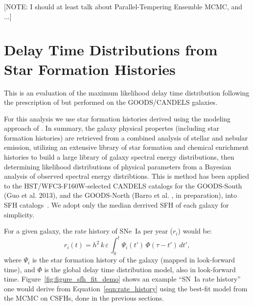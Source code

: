 \documentclass[apj]{aastex62}
\begin{document}
[NOTE: I should at least talk about Parallel-Tempering Ensemble MCMC, and ...]

\section{Delay Time Distributions from Star Formation Histories}
This is an evaluation of the maximum likelihood delay time distribution following the prescription of \cite{Maoz:2012a} but performed on the GOODS/CANDELS galaxies. 

For this analysis we use star formation histories derived using the modeling approach of \cite{Pacifici:2012ve}. In summary, the galaxy physical propertes (including star formation histories) are retrieved from a combined analysis of stellar and nebular emission, utilizing an extensive library of star formation and chemical enrichment histories to build a large library of galaxy spectral energy distributions, then determining likelihood distributions of physical parameters from a Bayesian analysis of observed spectral energy distribtions. This is method has been applied to the HST/WFC3-F160W-selected CANDELS catalogs for the GOODS-South (Guo et al. 2013), and the GOODS-North (Barro et al. , in preparation), into SFH catalogs~\cite{Pacifici:2016ul}. We adopt only the median derrived SFH of each galaxy for simplicity. 

For a given galaxy, the rate history of SNe~Ia per year ($r_i$) would be:
\begin{equation}
r_i (t) = h^2\,k\,\varepsilon\, \int_0^t \Psi_i(t')\,\Phi(\tau-t')\,dt',
\label{eqn:rate_history}
\end{equation}
\noindent where $\Psi_i$ is the star formation history of the galaxy (mapped in look-forward time), and $\Phi$ is the global delay time distribution model, also in look-forward time. Figure~\ref{fig:figure_sfh_fit_demo} shows an example ``SN~Ia rate history'' one would derive from Equation~\ref{eqn:rate_history} using the best-fit model from the MCMC on CSFHs, done in the previous sections.
\end{document}

